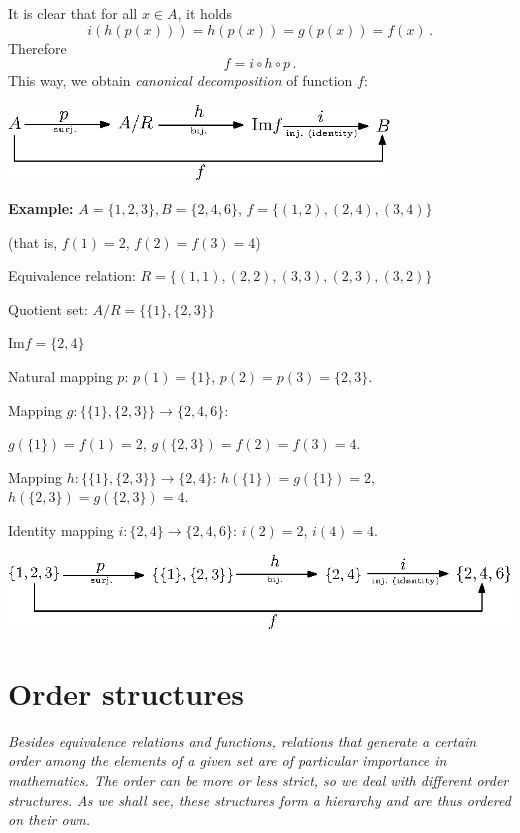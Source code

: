 \documentclass[11pt,paper=b5,footinclude,headinclude]{scrbook} %
\theoremstyle{remark}
\theoremstyle{definition} %
\theoremstyle{theorem} %
\begin{document}
It is clear that for all $x\in A$, it holds
$$i(h(p(x))) = h(p(x)) = g(p(x)) = f(x)\,.$$
Therefore
$$f = i\circ h\circ p\,.$$
This way, we obtain {\em canonical decomposition} of function $f$:
\begin{center}
\includegraphics[height=20mm]{dekompozicija2en.eps}
\end{center}

\textbf{ Example:}
$A = \{1,2,3\}, B = \{2,4,6\}$,
$f = \{(1,2),(2,4),(3,4)\}$

(that is, $f(1) = 2$, $f(2)= f(3) = 4$)

Equivalence relation: $R = \{(1,1),(2,2),(3,3),(2,3),(3,2)\}$

Quotient set: $A/R = \{\{1\},\{2,3\}\}$

$\textrm{Im} f = \{2,4\}$

Natural mapping $p$: $p(1) = \{1\}$, $p(2) = p(3) = \{2,3\}$.

Mapping $g: \{\{1\},\{2,3\}\}\to \{2,4,6\}$:

$g(\{1\}) = f(1) = 2$, $g(\{2,3\}) = f(2) = f(3) = 4$.

Mapping $h: \{\{1\},\{2,3\}\}\to \{2,4\}$:
$h(\{1\}) = g(\{1\}) = 2$, $h(\{2,3\}) = g(\{2,3\}) = 4$.

Identity mapping $i:\{2,4\}\to\{2,4,6\}$: $i(2) = 2$, $i(4) = 4$.

\begin{center}
\includegraphics[height=20mm]{dekompozicija3en.eps}
\end{center}

\newpage
\section{Order structures}

{\em Besides equivalence relations and functions, relations that generate a certain \emph{ order} among the elements of a given set
are of particular importance in mathematics. The order can be more or less strict, so we deal with different order structures. As we shall see, these structures form a hierarchy and are thus ordered on their own.}
\end{document}
